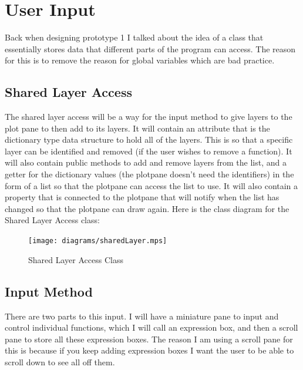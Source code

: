 \documentclass[../../../../main.tex]{subfiles}
\begin{document}
\section{User Input}
Back when designing prototype 1 I talked about the idea of a class that essentially stores data that different parts of the program can access. The reason for this is to remove the reason for global variables which are bad practice.
\subsection{Shared Layer Access}
The shared layer access will be a way for the input method to give layers to the plot pane to then add to its layers. It will contain an attribute that is the dictionary type data structure to hold all of the layers. This is so that a specific layer can be identified and removed (if the user wishes to remove a function). It will also contain public methods to add and remove layers from the list, and a getter for the dictionary values (the plotpane doesn't need the identifiers) in the form of a list so that the plotpane can access the list to use. It will also contain a property that is connected to the plotpane that will notify when the list has changed so that the plotpane can draw again. Here is the class diagram for the Shared Layer Access class:
\begin{figure}[H]
	\centering
	\texttt{[image: diagrams/sharedLayer.mps]}
	\caption{Shared Layer Access Class}
\end{figure}
\newpage
\subsection{Input Method}
There are two parts to this input. I will have a miniature pane to input and control individual functions, which I will call an expression box, and then a scroll pane to store all these expression boxes. The reason I am using a scroll pane for this is because if you keep adding expression boxes I want the user to be able to scroll down to see all off them.
\end{document}
